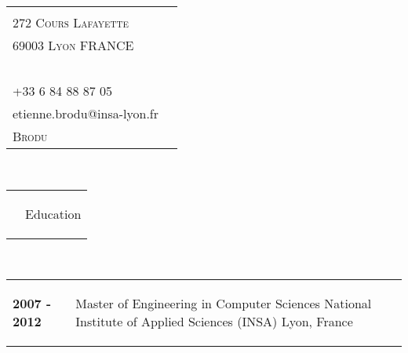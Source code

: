 \documentclass[a4paper,10pt]{article}
\makeatletter
\newlength{\bottomMarginHeader}
\newlength{\topMarginSection}
\newlength{\bottomMarginSection}
\newlength{\tabVSpace}
\newcommand{\mycolor}[1]{
	\textcolor[RGB]{59,134,254}{#1}
}
\newcommand{\rmp}[1]{
	\begin{minipage}[t]{5cm}
		\begin{flushright}
			#1
		\end{flushright}
	\end{minipage}	
}
\newcommand{\lmp}[1]{
	\begin{minipage}[t]{13cm}
		\begin{flushleft}
			#1
		\end{flushleft}
	\end{minipage}
}
\newcommand{\rltabvline}[2]{
	\begin{tabular}{ p{5cm} @{\hspace{\tabVSpace}} | @{\hspace{\tabVSpace}} p{16cm} }
	\rmp{#1} & \lmp{#2}
	\end{tabular}
}
\newcommand{\rltab}[2]{
	\begin{tabular}{ p{5cm} @{\hspace{2\tabVSpace}} p{16cm} }
	\rmp{#1} & \lmp{#2}
	\end{tabular}
}
\newcommand{\paragraphTitle}[1]{
		\huge{\mycolor{#1}}
}
\newcommand{\header}[2]{
	\rltabvline{#1}{#2}
	\vspace{\bottomMarginHeader}\\
}
\renewcommand{\section}[1]{
	\vspace{\topMarginSection}
	\rltab{}{\paragraphTitle{#1}}
	\vspace{\bottomMarginSection}\\
}
\renewcommand{\subsection}[2]{
	\rltab{\textbf{#1}}{#2}\\
}
\makeatother
\begin{document}
\pagestyle{empty}



\header{
		\mycolor{address} \\
		272 \textsc{Cours Lafayette} \\
		69003 \textsc{Lyon FRANCE}\\~\\
		+33 6 84 88 87 05\\
		etienne.brodu@insa-lyon.fr
	}
	{
		\Large{\textsc{Etienne}}\\
		\Large{\textsc{Brodu}}
	}
	
\section{Education}
\subsection{2007 - 2012}
			{Master of Engineering in Computer Sciences National Institute of Applied Sciences (INSA) Lyon, France}\\
\end{document}

